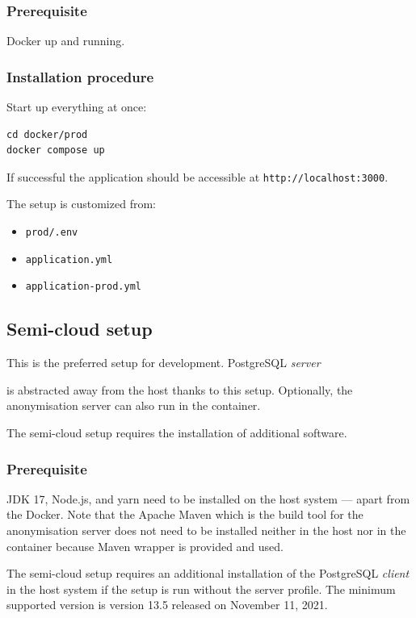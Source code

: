 \documentclass[a4paper,twoside,12pt]{book}
\newcommand{\ksremark}[1]{%
{%
{\color{brickred}{[#1]}}}%
\addcontentsline{rks}{uwagas}{\protect{#1}}%
}
\begin{document}
\subsubsection{Prerequisite}

Docker up and running.

\subsubsection{Installation procedure}

Start up everything at once:

\begin{verbatim}
cd docker/prod
docker compose up
\end{verbatim}

If successful the application should be accessible at \verb|http://localhost:3000|.

The setup is customized from:
\begin{itemize}
\item \verb|prod/.env|
\item \verb|application.yml|
\item \verb|application-prod.yml|
\end{itemize}


\subsection{Semi-cloud setup}

This is the preferred setup for development. PostgreSQL \textit{server} \ksremark{bez kursywy} is abstracted away from the host thanks to this setup. Optionally, the anonymisation server can also run in the container.

The semi-cloud setup requires the installation of additional software.

\subsubsection{Prerequisite}

JDK 17, Node.js, and yarn need to be installed on the host system — apart from the Docker. Note that the Apache Maven which is the build tool for the anonymisation server does not need to be installed neither in the host nor in the container because Maven wrapper is provided and used.

The semi-cloud setup requires an additional installation of the PostgreSQL \textit{client} in the host system if the setup is run without the server profile. The minimum supported version is version 13.5 released on November 11, 2021.
\end{document}
